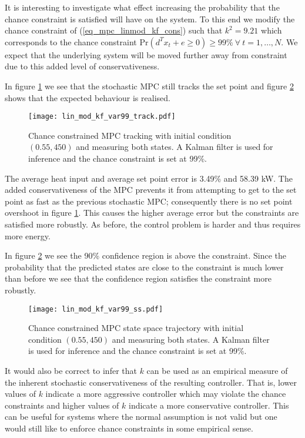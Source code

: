 It is interesting to investigate what effect increasing the probability that the chance constraint is satisfied will have on the system. To this end we modify the chance constraint of (\ref{eq_mpc_linmod_kf_cons}) such that $k^2 = 9.21$ which corresponds to the chance constraint $\text{Pr}(d^Tx_t + e \geq 0) \geq 99\% ~\forall ~t=1,\hdots,N$. We expect that the underlying system will be moved further away from constraint due to this added level of conservativeness.

In figure \ref{fig_lin_mod_kf_var99_track} we see that the stochastic MPC still tracks the set point and figure \ref{fig_lin_mod_kf_var99_ss} shows that the expected behaviour is realised. 
\begin{figure}[H] 
\centering
\texttt{[image: lin\_mod\_kf\_var99\_track.pdf]}
\caption{Chance constrained MPC tracking with initial condition $(0.55, 450)$ and measuring both states. A Kalman filter is used for inference and the chance constraint is set at 99\%.}
\label{fig_lin_mod_kf_var99_track}
\end{figure}
The average heat input and average set point error is 3.49\% and  58.39 kW. The added conservativeness of the MPC prevents it from attempting to get to the set point as fast as the previous stochastic MPC; consequently there is no set point overshoot in figure \ref{fig_lin_mod_kf_var99_track}. This causes the higher average error but the constraints are satisfied more robustly. As before, the control problem is harder and thus requires more energy.

In figure \ref{fig_lin_mod_kf_var99_ss} we see the 90\% confidence region is above the constraint. Since the probability that the predicted states are close to the constraint is much lower than before we see that the confidence region satisfies the constraint more robustly.
\begin{figure}[H] 
\centering
\texttt{[image: lin\_mod\_kf\_var99\_ss.pdf]}
\caption{Chance constrained MPC state space trajectory with initial condition $(0.55, 450)$ and measuring both states. A Kalman filter is used for inference and the chance constraint is set at 99\%.}
\label{fig_lin_mod_kf_var99_ss}
\end{figure}
It would also be correct to infer that $k$ can be used as an empirical measure of the inherent stochastic conservativeness of the resulting controller. That is, lower values of $k$ indicate a more aggressive controller which may violate the chance constraints and higher values of $k$ indicate a more conservative controller. This can be useful for systems where the normal assumption is not valid but one would still like to enforce chance constraints in some empirical sense. 

